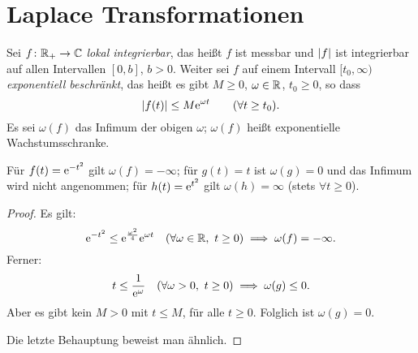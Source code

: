 \documentclass[a4paper,twoside,DIV15,BCOR12mm]{scrbook}
\begin{document}

\section{Laplace Transformationen}

Sei $f\colon\mathbb{R}_+\to\mathbb{C}$ \textit{lokal integrierbar}, das heißt $f$ ist messbar und $\left\lvert f\right\lvert$ ist integrierbar auf allen Intervallen $[0,b]$, $b>0$. Weiter sei $f$ auf einem Intervall $[t_0,\infty)$ \textit{exponentiell beschränkt}, das heißt es gibt $M\geq 0$, $\omega\in\mathbb{R}$, $t_0\geq 0$, so dass
\[\left\lvert f(t)\right\lvert\leq M\mathrm{e}^{\omega t}\qquad(\forall t\geq t_0).\]
Es sei $\omega(f)$ das Infimum der obigen $\omega$; $\omega(f)$ heißt exponentielle Wachstumsschranke.

\begin{bem*} Für $f(t)=\mathrm{e}^{-t^2}$ gilt $\omega(f)=-\infty$; für $g(t)=t$ ist $\omega(g)=0$ und das Infimum wird nicht angenommen; für $h(t)=\mathrm{e}^{t^2}$ gilt $\omega(h)=\infty$ (stets $\forall t\geq 0$).
\end{bem*}
\begin{proof}
Es gilt:
\[\mathrm{e}^{-t^2}\leq \mathrm{e}^{\frac{\omega^2}{4}}\mathrm{e}^{\omega t}\quad(\forall\omega\in\mathbb{R},\ t\geq 0)\implies\omega(f)=-\infty.\]
Ferner:
\[t\leq\frac{1}{\e^\omega}\quad(\forall\omega>0,\ t\geq0)\folgt\omega(g)\leq 0.\]
Aber es gibt kein $M>0$ mit $t\leq M$, für alle $t\geq 0$. Folglich ist $\omega(g)=0$.

Die letzte Behauptung beweist man ähnlich.
\end{proof}
\end{document}

